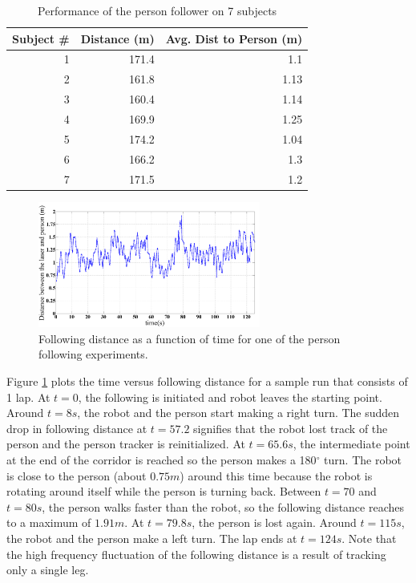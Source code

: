 \documentclass[3p]{elsarticle}
\begin{document}
\begin{table}[!h]
\begin{center}
  \begin{tabular}{| r || r | r |}
    \hline
    Subject \# & Distance (m) & Avg. Dist to Person (m) \\ \hline 
    1 & 171.4  & 1.1\\ \hline
    2 & 161.8  & 1.13\\ \hline
    3 & 160.4  & 1.14\\ \hline
    4 & 169.9  & 1.25\\ \hline
    5 & 174.2  & 1.04\\ \hline
    6 & 166.2  & 1.3\\ \hline
    7 & 171.5  & 1.2\\ \hline
  \end{tabular}
\label{tab:perf}
\end{center}
\caption {Performance of the person follower on 7 subjects}
\end{table}


\begin{figure}[ht!]
\centering
\includegraphics[width=0.65\textwidth]{pics/following_result}
\caption{Following distance as a function of time for one of the person following experiments.}
\label{fig:graph}
\end{figure}

Figure \ref{fig:graph} plots the time versus following distance for a sample run that consists of 1 lap. At $t=0$, the following is initiated and robot leaves the starting point. Around $t=8s$, the robot and the person start making a right turn. The sudden drop in following distance at $t=57.2$ signifies that the robot lost track of the person and the person tracker is reinitialized. At $t=65.6s$, the intermediate point at the end of the corridor is reached so the person makes a 180$^\circ$ turn. The robot is close to the person (about $0.75m$) around this time because the robot is rotating around itself while the person is turning back. Between $t=70$ and $t=80s$, the person walks faster than the robot, so the following distance reaches to a maximum of $1.91m$. At $t=79.8s$, the person is lost again. Around $t=115s$, the robot and the person make a left turn. The lap ends at $t=124s$. Note that the high frequency fluctuation of the following distance is a result of tracking only a single leg.
\end{document}
